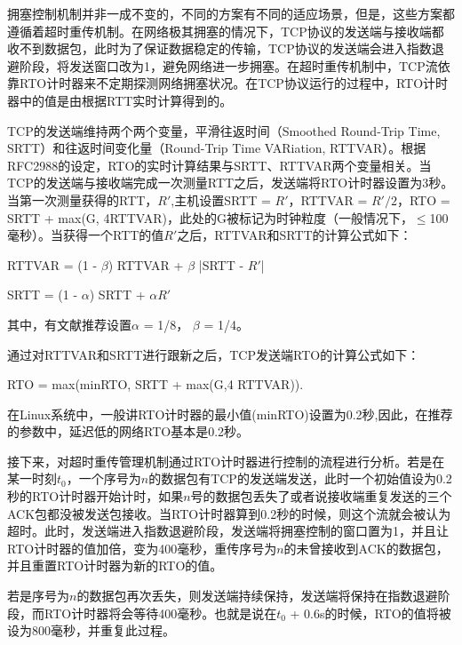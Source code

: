 拥塞控制机制并非一成不变的，不同的方案有不同的适应场景，但是，这些方案都遵循着超时重传机制。在网络极其拥塞的情况下，TCP协议的发送端与接收端都收不到数据包，此时为了保证数据稳定的传输，TCP协议的发送端会进入指数退避阶段，将发送窗口改为1，避免网络进一步拥塞。在超时重传机制中，TCP流依靠RTO计时器来不定期探测网络拥塞状况。在TCP协议运行的过程中，RTO计时器中的值是由根据RTT实时计算得到的。

TCP的发送端维持两个两个变量，平滑往返时间（Smoothed Round-Trip Time, SRTT）和往返时间变化量（Round-Trip Time VARiation, RTTVAR）。根据RFC2988\cite{2000Computing}的设定，RTO的实时计算结果与SRTT、RTTVAR两个变量相关。当TCP的发送端与接收端完成一次测量RTT之后，发送端将RTO计时器设置为3秒。
当第一次测量获得的RTT，$R'$,主机设置SRTT = $R'$，RTTVAR = $R' / 2$，RTO = SRTT + max(G, 4RTTVAR)，此处的G被标记为时钟粒度（一般情况下，$\leq$100毫秒）。当获得一个RTT的值$R'$之后，RTTVAR和SRTT的计算公式如下：


\begin{center}
    RTTVAR = (1 - $\beta$) RTTVAR + $\beta$ |SRTT - $R'$|
\vspace{-0.1in}
\end{center}

\begin{center}
    SRTT = (1 - $\alpha$) SRTT + $\alpha R'$
\end{center}

其中，有文献\cite{Jacobson1988Congestion}推荐设置$\alpha$ = 1/8， $\beta$ = 1/4。


通过对RTTVAR和SRTT进行跟新之后，TCP发送端RTO的计算公式如下：
\begin{center}
    RTO = max(minRTO, SRTT + max(G,4 RTTVAR)).
\end{center}

在Linux系统中，一般讲RTO计时器的最小值(minRTO)设置为0.2秒,因此，在推荐的参数中，延迟低的网络RTO基本是0.2秒。

接下来，对超时重传管理机制通过RTO计时器进行控制的流程进行分析。若是在某一时刻$t_0$，一个序号为$n$的数据包有TCP的发送端发送，此时一个初始值设为0.2秒的RTO计时器开始计时，如果$n$号的数据包丢失了或者说接收端重复发送的三个ACK包都没被发送包接收。当RTO计时器算到0.2秒的时候，则这个流就会被认为超时。此时，发送端进入指数退避阶段，发送端将拥塞控制的窗口置为1，并且让RTO计时器的值加倍，变为400毫秒，重传序号为$n$的未曾接收到ACK的数据包，并且重置RTO计时器为新的RTO的值。

若是序号为$n$的数据包再次丢失，则发送端持续保持，发送端将保持在指数退避阶段，而RTO计时器将会等待400毫秒。也就是说在$t_0$ + 0.6s的时候，RTO的值将被设为800毫秒，并重复此过程。

